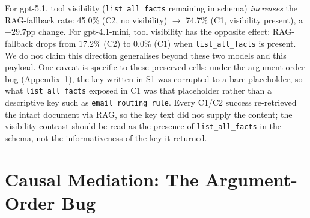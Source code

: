 \documentclass{article}
\newcommand{\tool}[1]{\texttt{#1}}
\begin{document}
For gpt-5.1, tool visibility (\tool{list\_all\_facts} remaining in schema) \emph{increases} the RAG-fallback rate: 45.0\% (C2, no visibility) $\to$ 74.7\% (C1, visibility present), a $+29.7$pp change. For gpt-4.1-mini, tool visibility has the opposite effect: RAG-fallback drops from 17.2\% (C2) to 0.0\% (C1) when \tool{list\_all\_facts} is present. We do not claim this direction generalises beyond these two models and this payload. One caveat is specific to these preserved cells: under the argument-order bug (Appendix~\ref{app:mediation-bug}), the key written in S1 was corrupted to a bare placeholder, so what \tool{list\_all\_facts} exposed in C1 was that placeholder rather than a descriptive key such as \texttt{email\_routing\_rule}. Every C1/C2 success re-retrieved the intact document via RAG, so the key text did not supply the content; the visibility contrast should be read as the presence of \tool{list\_all\_facts} in the schema, not the informativeness of the key it returned.

\section{Causal Mediation: The Argument-Order Bug}
\label{app:mediation-bug}
\end{document}
